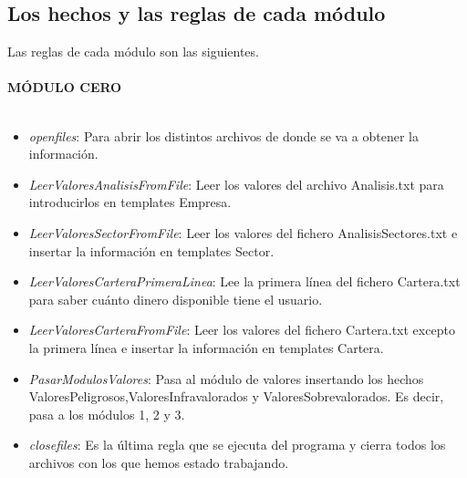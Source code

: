 \subsection{Los hechos y las reglas de cada módulo}
Las reglas de cada módulo son las siguientes.\\\\
\textbf{MÓDULO CERO}\\\\
\begin{itemize}
	\item \textit{openfiles}: Para abrir los distintos archivos de donde se va a obtener la información.
	\item \textit{LeerValoresAnalisisFromFile}: Leer los valores del archivo Analisis.txt para introducirlos en templates Empresa.
	\item \textit{LeerValoresSectorFromFile}: Leer los valores del fichero AnalisisSectores.txt e insertar la información en templates Sector.
	\item \textit{LeerValoresCarteraPrimeraLinea}: Lee la primera línea del fichero Cartera.txt para saber cuánto dinero disponible tiene el usuario.
	\item \textit{LeerValoresCarteraFromFile}: Leer los valores del fichero Cartera.txt excepto la primera línea e insertar la información en templates Cartera.
	\item \textit{PasarModulosValores}: Pasa al módulo de valores insertando los hechos ValoresPeligrosos,ValoresInfravalorados y ValoresSobrevalorados. Es decir, pasa a los módulos 1, 2 y 3.
	\item \textit{closefiles}: Es la última regla que se ejecuta del programa y cierra todos los archivos con los que hemos estado trabajando.\\
\end{itemize}

